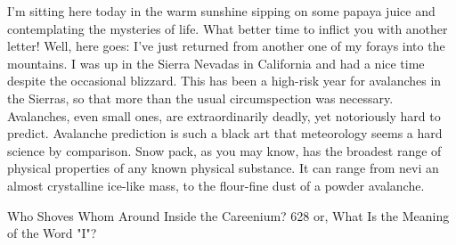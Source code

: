       I'm sitting here today in the warm sunshine sipping on some papaya juice and
  contemplating the mysteries of life. What better time to inflict you with another
  letter!
      Well, here goes: I've just returned from another one of my forays into the
  mountains. I was up in the Sierra Nevadas in California and had a nice time
  despite the occasional blizzard. This has been a high-risk year for avalanches in
  the Sierras, so that more than the usual circumspection was necessary.
      Avalanches, even small ones, are extraordinarily deadly, yet notoriously hard
  to predict.
      Avalanche prediction is such a black art that meteorology seems a hard
  science by comparison. Snow pack, as you may know, has the broadest range of
  physical properties of any known physical substance. It can range from nevi an
  almost crystalline ice-like mass, to the flour-fine dust of a powder avalanche.


Who Shoves Whom Around Inside the Careenium?                                        628
or, What Is the Meaning of the Word "I"?


